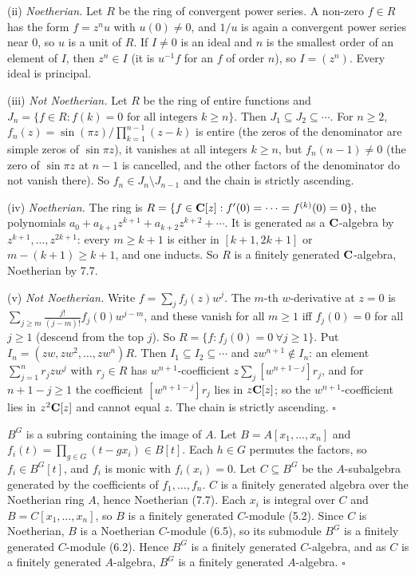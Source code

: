 \documentclass[11pt]{article}
\begin{document}
(ii) \emph{Noetherian.} Let $R$ be the ring of convergent power series. A non-zero $f\in R$ has the form $f=z^nu$ with $u(0)\ne0$, and $1/u$ is again a convergent power series near $0$, so $u$ is a unit of $R$. If $I\ne0$ is an ideal and $n$ is the smallest order of an element of $I$, then $z^n\in I$ (it is $u^{-1}f$ for an $f$ of order $n$), so $I=(z^n)$. Every ideal is principal.

(iii) \emph{Not Noetherian.} Let $R$ be the ring of entire functions and $J_n=\{f\in R:f(k)=0\text{ for all integers }k\ge n\}$. Then $J_1\subseteq J_2\subseteq\cdots$. For $n\ge2$, $f_n(z)=\sin(\pi z)/\prod_{k=1}^{n-1}(z-k)$ is entire (the zeros of the denominator are simple zeros of $\sin\pi z$), it vanishes at all integers $k\ge n$, but $f_n(n-1)\ne0$ (the zero of $\sin\pi z$ at $n-1$ is cancelled, and the other factors of the denominator do not vanish there). So $f_n\in J_n\setminus J_{n-1}$ and the chain is strictly ascending.

(iv) \emph{Noetherian.} The ring is $R=\{f\in\mathbf C[z]:f'(0)=\dots=f^{(k)}(0)=0\}$, the polynomials $a_0+a_{k+1}z^{k+1}+a_{k+2}z^{k+2}+\cdots$. It is generated as a $\mathbf C$-algebra by $z^{k+1},\dots,z^{2k+1}$: every $m\ge k+1$ is either in $[k+1,2k+1]$ or $m-(k+1)\ge k+1$, and one inducts. So $R$ is a finitely generated $\mathbf C$-algebra, Noetherian by 7.7.

(v) \emph{Not Noetherian.} Write $f=\sum_jf_j(z)w^j$. The $m$-th $w$-derivative at $z=0$ is $\sum_{j\ge m}\frac{j!}{(j-m)!}f_j(0)w^{j-m}$, and these vanish for all $m\ge1$ iff $f_j(0)=0$ for all $j\ge1$ (descend from the top $j$). So $R=\{f:f_j(0)=0\ \forall j\ge1\}$. Put $I_n=(zw,zw^2,\dots,zw^n)R$. Then $I_1\subseteq I_2\subseteq\cdots$ and $zw^{n+1}\notin I_n$: an element $\sum_{j=1}^nr_jzw^j$ with $r_j\in R$ has $w^{n+1}$-coefficient $z\sum_j[w^{n+1-j}]r_j$, and for $n+1-j\ge1$ the coefficient $[w^{n+1-j}]r_j$ lies in $z\mathbf C[z]$; so the $w^{n+1}$-coefficient lies in $z^2\mathbf C[z]$ and cannot equal $z$. The chain is strictly ascending. \hfill$\square$

\pf
$B^G$ is a subring containing the image of $A$. Let $B=A[x_1,\dots,x_n]$ and $f_i(t)=\prod_{g\in G}(t-gx_i)\in B[t]$. Each $h\in G$ permutes the factors, so $f_i\in B^G[t]$, and $f_i$ is monic with $f_i(x_i)=0$. Let $C\subseteq B^G$ be the $A$-subalgebra generated by the coefficients of $f_1,\dots,f_n$. $C$ is a finitely generated algebra over the Noetherian ring $A$, hence Noetherian (7.7). Each $x_i$ is integral over $C$ and $B=C[x_1,\dots,x_n]$, so $B$ is a finitely generated $C$-module (5.2). Since $C$ is Noetherian, $B$ is a Noetherian $C$-module (6.5), so its submodule $B^G$ is a finitely generated $C$-module (6.2). Hence $B^G$ is a finitely generated $C$-algebra, and as $C$ is a finitely generated $A$-algebra, $B^G$ is a finitely generated $A$-algebra. \hfill$\square$
\end{document}
